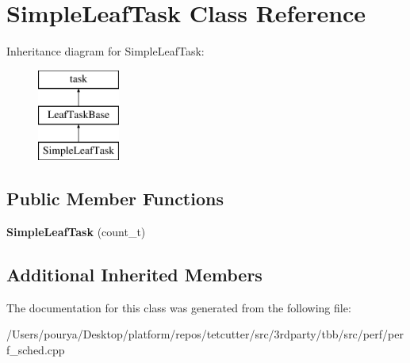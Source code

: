 \hypertarget{classSimpleLeafTask}{}\section{Simple\+Leaf\+Task Class Reference}
\label{classSimpleLeafTask}
Inheritance diagram for Simple\+Leaf\+Task\+:\begin{figure}[H]
\begin{center}
\leavevmode
\includegraphics[height=3.000000cm]{classSimpleLeafTask}
\end{center}
\end{figure}
\subsection*{Public Member Functions}
\begin{DoxyCompactItemize}
\item 
\hypertarget{classSimpleLeafTask_a50075a5d62c44659f241b09d5d912705}{}{\bfseries Simple\+Leaf\+Task} (count\+\_\+t)\label{classSimpleLeafTask_a50075a5d62c44659f241b09d5d912705}

\end{DoxyCompactItemize}
\subsection*{Additional Inherited Members}


The documentation for this class was generated from the following file\+:\begin{DoxyCompactItemize}
\item 
/\+Users/pourya/\+Desktop/platform/repos/tetcutter/src/3rdparty/tbb/src/perf/perf\+\_\+sched.\+cpp\end{DoxyCompactItemize}
